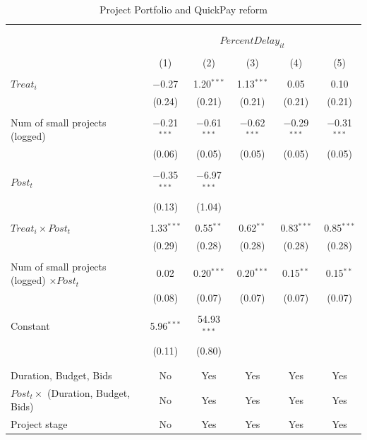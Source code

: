 \documentclass[
]{article}
\begin{document}
\begin{table}[H] \centering 
  \caption{Project Portfolio and QuickPay reform} 
  \label{} 
\small 
\begin{tabular}{@{\extracolsep{-10pt}}lccccc} 
\\[-1.8ex]\hline 
\hline \\[-1.8ex] 
\\[-1.8ex] & \multicolumn{5}{c}{$PercentDelay_{it}$} \\ 
\\[-1.8ex] & (1) & (2) & (3) & (4) & (5)\\ 
\hline \\[-1.8ex] 
 $Treat_i$ & $-$0.27 & 1.20$^{***}$ & 1.13$^{***}$ & 0.05 & 0.10 \\ 
  & (0.24) & (0.21) & (0.21) & (0.21) & (0.21) \\ 
  & & & & & \\ 
 Num of small projects (logged) & $-$0.21$^{***}$ & $-$0.61$^{***}$ & $-$0.62$^{***}$ & $-$0.29$^{***}$ & $-$0.31$^{***}$ \\ 
  & (0.06) & (0.05) & (0.05) & (0.05) & (0.05) \\ 
  & & & & & \\ 
 $Post_t$ & $-$0.35$^{***}$ & $-$6.97$^{***}$ &  &  &  \\ 
  & (0.13) & (1.04) &  &  &  \\ 
  & & & & & \\ 
 $Treat_i \times Post_t$ & 1.33$^{***}$ & 0.55$^{**}$ & 0.62$^{**}$ & 0.83$^{***}$ & 0.85$^{***}$ \\ 
  & (0.29) & (0.28) & (0.28) & (0.28) & (0.28) \\ 
  & & & & & \\ 
 Num of small projects (logged) $\times Post_t$ & 0.02 & 0.20$^{***}$ & 0.20$^{***}$ & 0.15$^{**}$ & 0.15$^{**}$ \\ 
  & (0.08) & (0.07) & (0.07) & (0.07) & (0.07) \\ 
  & & & & & \\ 
 Constant & 5.96$^{***}$ & 54.93$^{***}$ &  &  &  \\ 
  & (0.11) & (0.80) &  &  &  \\ 
  & & & & & \\ 
\hline \\[-1.8ex] 
Duration, Budget, Bids & No & Yes & Yes & Yes & Yes \\ 
$Post_t \times $  (Duration, Budget, Bids) & No & Yes & Yes & Yes & Yes \\ 
Project stage & No & Yes & Yes & Yes & Yes \\ 

\end{tabular}
\end{table}
\end{document}
